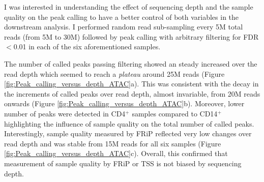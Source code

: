 I was interested in understanding the effect of sequencing depth and the sample quality on the peak calling to have a better control of both variables in the downstream analysis. I performed random read sub-sampling every 5M total reads (from 5M to 30M) followed by peak calling with arbitrary filtering for FDR$<$0.01 in each of the six aforementioned samples. 

The number of called peaks passing filtering showed an steady increased over the read depth which seemed to reach a \textit{plateau} around 25M reads (Figure \ref{fig:Peak_calling_versus_depth_ATAC}a). This was consistent with the decay in the increments of called peaks over read depth, almost invariable, from 20M reads onwards (Figure \ref{fig:Peak_calling_versus_depth_ATAC}b). Moreover, lower number of peaks were detected in CD4$^+$ samples compared to CD14$^+$ highlighting the influence of sample quality on the total number of called peaks. Interestingly, sample quality measured by FRiP reflected very low changes over read depth and was stable from 15M reads for all six samples (Figure \ref{fig:Peak_calling_versus_depth_ATAC}c). Overall, this confirmed that measurement of sample quality by FRiP or TSS is not biased by sequencing depth.


